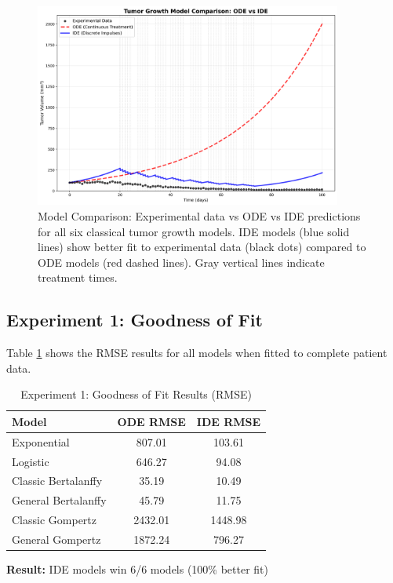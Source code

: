\documentclass[11pt]{article}
\begin{document}
\begin{figure}[h]
\centering
\includegraphics[width=0.9\textwidth]{tumor_model_comparison.png}
\caption{Model Comparison: Experimental data vs ODE vs IDE predictions for all six classical tumor growth models. IDE models (blue solid lines) show better fit to experimental data (black dots) compared to ODE models (red dashed lines). Gray vertical lines indicate treatment times.}
\label{fig:model_comparison}
\end{figure}

\subsection{Experiment 1: Goodness of Fit}

Table \ref{tab:exp1} shows the RMSE results for all models when fitted to complete patient data.

\begin{table}[h]
\centering
\caption{Experiment 1: Goodness of Fit Results (RMSE)}
\label{tab:exp1}
\begin{tabular}{@{}lcc@{}}
\toprule
Model & ODE RMSE & IDE RMSE \\
\midrule
Exponential & 807.01 & 103.61 \\
Logistic & 646.27 & 94.08 \\
Classic Bertalanffy & 35.19 & 10.49 \\
General Bertalanffy & 45.79 & 11.75 \\
Classic Gompertz & 2432.01 & 1448.98 \\
General Gompertz & 1872.24 & 796.27 \\
\bottomrule
\end{tabular}
\end{table}

\textbf{Result:} IDE models win 6/6 models (100\% better fit)
\end{document}
